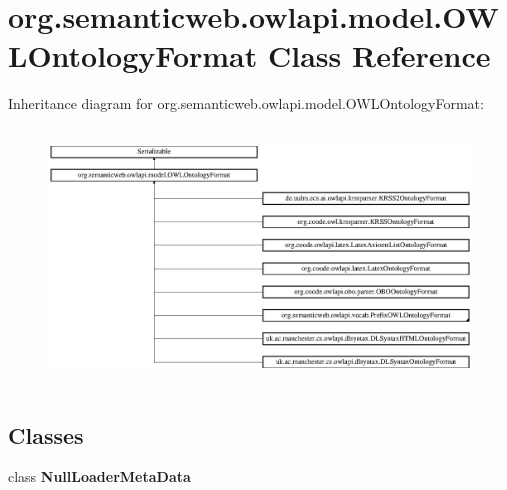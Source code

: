 \hypertarget{classorg_1_1semanticweb_1_1owlapi_1_1model_1_1_o_w_l_ontology_format}{\section{org.\-semanticweb.\-owlapi.\-model.\-O\-W\-L\-Ontology\-Format Class Reference}
\label{classorg_1_1semanticweb_1_1owlapi_1_1model_1_1_o_w_l_ontology_format}
}
Inheritance diagram for org.\-semanticweb.\-owlapi.\-model.\-O\-W\-L\-Ontology\-Format\-:\begin{figure}[H]
\begin{center}
\leavevmode
\includegraphics[height=6.845965cm]{classorg_1_1semanticweb_1_1owlapi_1_1model_1_1_o_w_l_ontology_format}
\end{center}
\end{figure}
\subsection*{Classes}
\begin{DoxyCompactItemize}
\item 
class {\bfseries Null\-Loader\-Meta\-Data}
\end{DoxyCompactItemize}

